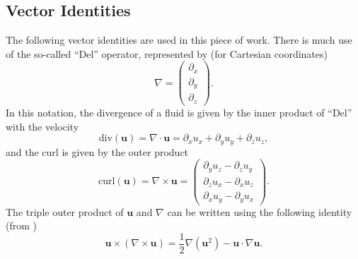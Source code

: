 \documentclass[10pt, a4paper]{article}
\numberwithin{equation}{section}
\newcommand{\vel}{\bm{u}}
\newcommand{\del}{\nabla}
\newcommand{\deldot}{\nabla \cdot}
\newcommand{\delcross}{\nabla \times}
\newcommand{\inv}[1]{\frac{1}{#1}}
\begin{document}
\subsection{Vector Identities}
The following vector identities are used in this piece of work.
There is much use of the so-called ``Del'' operator, represented by (for Cartesian coordinates)
\begin{equation}
\label{eq:deldef}
\del=\left(\begin{array}{c} \partial_{x}\\\partial_{y}\\\partial_{z}\end{array}\right).
\end{equation}
In this notation, the divergence of a fluid is given by the inner product of ``Del'' with the velocity
\begin{equation}
\label{eq:divdef}
\mbox{div} (\vel) = \deldot \vel = \partial_x u_x + \partial_y u_y + \partial_z u_z,
\end{equation}
and the curl is given by the outer product
\begin{equation}
\label{eq:curldef}
\mbox{curl} (\vel) = \delcross \vel = \left(\begin{array}{c} \partial_y u_z -\partial_z u_y\\\partial_z u_x - \partial_x u_z\\\partial_x u_y - \partial_y u_x\end{array}\right).
\end{equation}
The triple outer product of $\vel$ and $\del$ can be written using the following identity (from \citet{harlen14c6})
\begin{equation}
\label{eq:vecid1}
\vel\times (\delcross \vel)=\inv{2}\del(\vel^2) -\vel\cdot\del\vel.
\end{equation}
\end{document}
